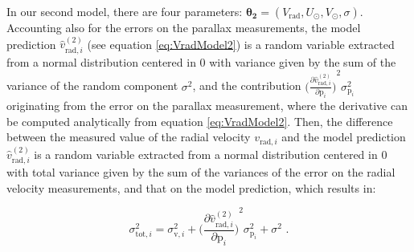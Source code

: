 In our second model, there are four parameters: $\mathbf{\theta_2} = (V_{\text{rad}}, U_{\odot}, V_{\odot}, \sigma)$. 
Accounting also for the errors on the parallax measurements, the model prediction $\hat{v}^{(2)}_{\text{rad}, i}$ (see equation \ref{eq:VradModel2}) is a random variable extracted from a normal distribution centered in 0 with variance given by the sum of the variance of the random component $\sigma^2$, and the contribution $ {\bigl( \frac{\partial \hat{v}^{(2)}_{\text{rad}, i}}{\partial \text{p}_i} \bigr)}^2 \sigma^2_{\text{p}_i}$ originating from the error on the parallax measurement, 
%
%
where the derivative can be computed analytically from equation \ref{eq:VradModel2}.
Then, the difference between the measured value of the radial velocity $v_{\text{rad}, i}$ and the model prediction $\hat{v}^{(2)}_{\text{rad}, i}$ is a random variable extracted from a normal distribution centered in 0 with total variance given by the sum of the variances of the error on the radial velocity measurements, and that on the model prediction, which results in:

\begin{equation}\label{eq:ErrorPropagation}
    \sigma^2_{\text{tot}, i} = \sigma^2_{\text{v},i} +  {\bigl( \frac{\partial \hat{v}^{(2)}_{\text{rad}, i}}{\partial \text{p}_i} \bigr)}^2 \sigma^2_{\text{p}_i} + \sigma^2 \text{ .}
\end{equation}

